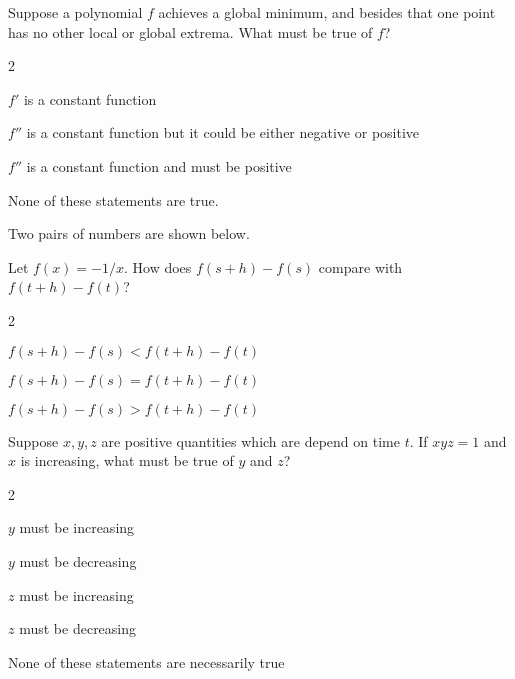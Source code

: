 \documentclass[12pt]{ximera}
\renewenvironment{multipleChoice}
{\begin{trivlist}\item[\hskip\labelsep\small\bfseries Choose the best answer:]
\hfil\begin{enumerate}\begin{multicols}{2}}
 {\end{multicols}\end{enumerate}\end{trivlist}}
\renewcommand{\choice}[2][]{\item \begin{minipage}[t]{2in}#2\end{minipage}\ifthenelse{\boolean{#1}}{\ifhandout \else  \fi}{}}
\begin{document}
\vspace{6ex}

\begin{minipage}{\textwidth}
\begin{problem}
  Suppose a polynomial $f$ achieves a global minimum, and besides that
  one point has no other local or global extrema.  What must be true
  of $f$?
  \begin{multipleChoice}
    \choice{$f'$ is a constant function}
    \choice{$f''$ is a constant function but it could be either negative or positive}
    \choice{$f''$ is a constant function and must be positive}
    \choice[correct]{None of these statements are true.}
  \end{multipleChoice}
\end{problem}
\end{minipage}

\vspace{6ex}

\begin{minipage}{\textwidth}
\begin{problem}
  Two pairs of numbers are shown below.
  \begin{image}
  \end{image}
  Let $f(x) = -1/x$.  How does $f(s+h)-f(s)$ compare with $f(t+h) - f(t)$?
  \begin{multipleChoice}
    \choice{$f(s+h) - f(s) < f(t+h) - f(t)$}
    \choice{$f(s+h) - f(s) = f(t+h) - f(t)$}
    \choice[correct]{$f(s+h) - f(s) > f(t+h) - f(t)$}
  \end{multipleChoice}
\end{problem}
\end{minipage}

\vspace{6ex}

\begin{minipage}{\textwidth}
\begin{problem}
  Suppose $x, y, z$ are positive quantities which are depend on time
  $t$.  If $xyz = 1$ and $x$ is increasing, what must be true of $y$ and $z$?
  \begin{multipleChoice}
    \choice{$y$ must be increasing}
    \choice{$y$ must be decreasing}
    \choice{$z$ must be increasing}
    \choice{$z$ must be decreasing}
    \choice[correct]{None of these statements are necessarily true}
  \end{multipleChoice}
\end{problem}
\end{minipage}
\end{document}

